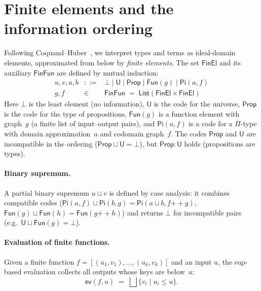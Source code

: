 \documentclass[11pt]{article}
\newcommand{\PropCode}{\mathsf{Prop}}
\newcommand{\FinEl}{\mathsf{FinEl}}
\newcommand{\FinFun}{\mathsf{FinFun}}
\newcommand{\Bot}{\bot}
\newcommand{\UCode}{\mathsf{U}}
\newcommand{\FunEl}[1]{\mathsf{Fun}(#1)}
\newcommand{\PiC}[2]{\mathsf{Pi}(#1,#2)}
\newcommand{\EvalFun}{\mathsf{ev}}
\newcommand{\LeCode}{\leq}
\newcommand{\Sup}{\sqcup}
\newcommand{\FinMem}{\mathrel{:}}
\begin{document}
\section{Finite elements and the information ordering}

Following Coquand--Huber~\cite{CH2018}, we interpret types and terms
as ideal-domain elements, approximated from below by \emph{finite
elements}.  The set $\FinEl$ and its auxiliary $\FinFun$ are defined
by mutual induction:
\[
  \begin{array}{rcl}
    u,v,a,b &::=& \Bot \mid \UCode \mid \PropCode \mid \FunEl{g} \mid \PiC{a}{f} \\[3pt]
    g,f &\in& \FinFun \;=\; \mathsf{List}(\FinEl \times \FinEl)
  \end{array}
\]
Here $\Bot$ is the least element (no information),
$\UCode$ is the code for the universe,
$\PropCode$ is the code for the type of propositions,
$\FunEl{g}$ is a function element with graph~$g$
(a finite list of input--output pairs),
and $\PiC{a}{f}$ is a code for a $\Pi$-type with domain
approximation~$a$ and codomain graph~$f$.
The codes $\PropCode$ and $\UCode$ are incompatible in the ordering
($\PropCode \Sup \UCode = \Bot$), but $\PropCode \FinMem \UCode$
holds (propositions are types).

\paragraph{Binary supremum.}
A partial binary supremum $u \Sup v$ is defined by case analysis:
it combines compatible codes ($\PiC{a}{f} \Sup \PiC{b}{g} =
\PiC{a \Sup b}{f \mathbin{+\!\!+} g}$,
$\FunEl{g} \Sup \FunEl{h} = \FunEl{g \mathbin{+\!\!+} h}$)
and returns $\Bot$ for incompatible pairs
(e.g.\ $\UCode \Sup \FunEl{g} = \Bot$).

\paragraph{Evaluation of finite functions.}
Given a finite function $f = [(u_1,v_1), \dots, (u_k,v_k)]$ and an
input $u$, the sup-based evaluation collects all outputs whose keys
are below~$u$:
\[
  \EvalFun(f, u) \;=\; \bigsqcup\{ v_i \mid u_i \LeCode u \}.
\]
\end{document}
